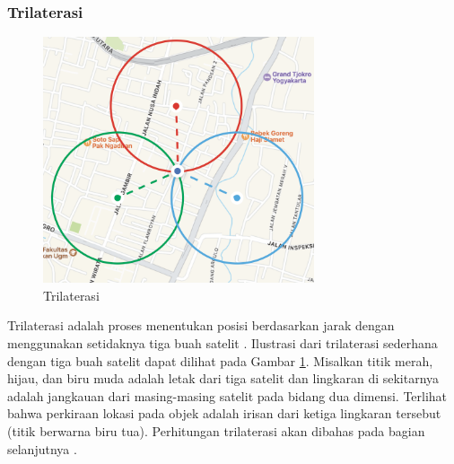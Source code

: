 \subsubsection{Trilaterasi}
\begin{figure}[ht]
	\centering
	\includegraphics[width=8cm]{contents/chapter-2/trilaterasi.png}
	\caption{Trilaterasi}
	\label{Fig: Trilaterasi}
\end{figure}
Trilaterasi adalah proses menentukan posisi berdasarkan jarak dengan menggunakan setidaknya tiga buah satelit \cite{AmericanSocietyofCivilEngineers1994}. Ilustrasi dari trilaterasi sederhana dengan tiga buah satelit dapat dilihat pada Gambar \ref{Fig: Trilaterasi}. Misalkan titik merah, hijau, dan biru muda adalah letak dari tiga satelit dan lingkaran di sekitarnya adalah jangkauan dari masing-masing satelit pada bidang dua dimensi. Terlihat bahwa perkiraan lokasi pada objek adalah irisan dari ketiga lingkaran tersebut (titik berwarna biru tua). Perhitungan trilaterasi akan dibahas pada bagian selanjutnya \cite{Seo2012}.

